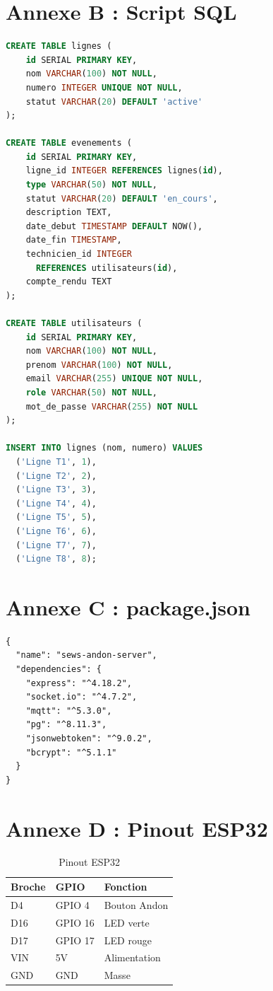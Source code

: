 \section{Annexe B : Script SQL}

\begin{lstlisting}[language=SQL,
caption={Initialisation de la base},
label={lst:sql_init}]
CREATE TABLE lignes (
    id SERIAL PRIMARY KEY,
    nom VARCHAR(100) NOT NULL,
    numero INTEGER UNIQUE NOT NULL,
    statut VARCHAR(20) DEFAULT 'active'
);

CREATE TABLE evenements (
    id SERIAL PRIMARY KEY,
    ligne_id INTEGER REFERENCES lignes(id),
    type VARCHAR(50) NOT NULL,
    statut VARCHAR(20) DEFAULT 'en_cours',
    description TEXT,
    date_debut TIMESTAMP DEFAULT NOW(),
    date_fin TIMESTAMP,
    technicien_id INTEGER 
      REFERENCES utilisateurs(id),
    compte_rendu TEXT
);

CREATE TABLE utilisateurs (
    id SERIAL PRIMARY KEY,
    nom VARCHAR(100) NOT NULL,
    prenom VARCHAR(100) NOT NULL,
    email VARCHAR(255) UNIQUE NOT NULL,
    role VARCHAR(50) NOT NULL,
    mot_de_passe VARCHAR(255) NOT NULL
);

INSERT INTO lignes (nom, numero) VALUES
  ('Ligne T1', 1),
  ('Ligne T2', 2),
  ('Ligne T3', 3),
  ('Ligne T4', 4),
  ('Ligne T5', 5),
  ('Ligne T6', 6),
  ('Ligne T7', 7),
  ('Ligne T8', 8);
\end{lstlisting}

\section{Annexe C : package.json}

\begin{lstlisting}[caption={Dependances backend},
label={lst:package_backend}]
{
  "name": "sews-andon-server",
  "dependencies": {
    "express": "^4.18.2",
    "socket.io": "^4.7.2",
    "mqtt": "^5.3.0",
    "pg": "^8.11.3",
    "jsonwebtoken": "^9.0.2",
    "bcrypt": "^5.1.1"
  }
}
\end{lstlisting}

\section{Annexe D : Pinout ESP32}

\begin{table}[htbp]
\centering
\begin{tabular}{l l l}
\toprule
\textbf{Broche} & \textbf{GPIO} & \textbf{Fonction} \\
\midrule
D4 & GPIO 4 & Bouton Andon \\
D16 & GPIO 16 & LED verte \\
D17 & GPIO 17 & LED rouge \\
VIN & 5V & Alimentation \\
GND & GND & Masse \\
\bottomrule
\end{tabular}
\caption{Pinout ESP32}
\label{tab:pinout}
\end{table}